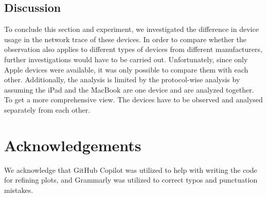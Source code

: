 \documentclass[sigconf,nonacm]{acmart}
\begin{document}
\subsection{Discussion}
To conclude this section and experiment, we investigated the difference in device usage in the network trace of these devices. In order to compare whether the observation also applies to different types of devices from different manufacturers, further investigations would have to be carried out. Unfortunately, since only Apple devices were available, it was only possible to compare them with each other. Additionally, the analysis is limited by the protocol-wise analysis by assuming the iPad and the MacBook are one device and are analyzed together. To get a more comprehensive view. The devices have to be observed and analysed separately from each other. 

\section*{Acknowledgements}
We acknowledge that GitHub Copilot was utilized to help with writing the code for refining plots, and Grammarly was utilized to correct typos and punctuation mistakes. 







\end{document}
